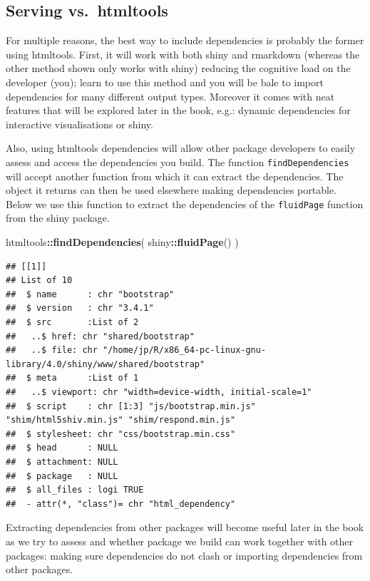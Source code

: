 \documentclass[
]{krantz}
\makeatletter
\newenvironment{Shaded}{\begin{snugshade}}{\end{snugshade}}
\newcommand{\KeywordTok}[1]{\textcolor[rgb]{0.27,0.27,0.27}{\textbf{#1}}}
\newcommand{\NormalTok}[1]{#1}
\newcommand{\OperatorTok}[1]{\textcolor[rgb]{0.43,0.43,0.43}{\textbf{#1}}}
\newenvironment{kframe}{%
\medskip{}
\setlength{\fboxsep}{.8em}
 \def\at@end@of@kframe{}%
 \ifinner\ifhmode%
  \def\at@end@of@kframe{\end{minipage}}%
  \begin{minipage}{\columnwidth}%
 \fi\fi%
 \def\FrameCommand##1{\hskip\@totalleftmargin \hskip-\fboxsep
 \colorbox{shadecolor}{##1}\hskip-\fboxsep
     \hskip-\linewidth \hskip-\@totalleftmargin \hskip\columnwidth}%
 \MakeFramed {\advance\hsize-\width
   \@totalleftmargin\z@ \linewidth\hsize
   \@setminipage}}%
 {\par\unskip\endMakeFramed%
 \at@end@of@kframe}
\renewenvironment{Shaded}{\begin{kframe}}{\end{kframe}}
\makeatother
\begin{document}
\hypertarget{basics-deps-pro-cons}{%
\subsection{Serving vs.~htmltools}\label{basics-deps-pro-cons}}

For multiple reasons, the best way to include dependencies is probably the former using htmltools. First, it will work with both shiny and rmarkdown \citep{R-rmarkdown} (whereas the other method shown only works with shiny) reducing the cognitive load on the developer (you); learn to use this method and you will be bale to import dependencies for many different output types. Moreover it comes with neat features that will be explored later in the book, e.g.: dynamic dependencies for interactive visualisations or shiny.

Also, using htmltools dependencies will allow other package developers to easily assess and access the dependencies you build. The function \texttt{findDependencies} will accept another function from which it can extract the dependencies. The object it returns can then be used elsewhere making dependencies portable. Below we use this function to extract the dependencies of the \texttt{fluidPage} function from the shiny package.

\begin{Shaded}
\begin{Highlighting}[]
\NormalTok{htmltools}\OperatorTok{::}\KeywordTok{findDependencies}\NormalTok{(}
\NormalTok{  shiny}\OperatorTok{::}\KeywordTok{fluidPage}\NormalTok{()}
\NormalTok{) }
\end{Highlighting}
\end{Shaded}

\begin{verbatim}
## [[1]]
## List of 10
##  $ name      : chr "bootstrap"
##  $ version   : chr "3.4.1"
##  $ src       :List of 2
##   ..$ href: chr "shared/bootstrap"
##   ..$ file: chr "/home/jp/R/x86_64-pc-linux-gnu-library/4.0/shiny/www/shared/bootstrap"
##  $ meta      :List of 1
##   ..$ viewport: chr "width=device-width, initial-scale=1"
##  $ script    : chr [1:3] "js/bootstrap.min.js" "shim/html5shiv.min.js" "shim/respond.min.js"
##  $ stylesheet: chr "css/bootstrap.min.css"
##  $ head      : NULL
##  $ attachment: NULL
##  $ package   : NULL
##  $ all_files : logi TRUE
##  - attr(*, "class")= chr "html_dependency"
\end{verbatim}

Extracting dependencies from other packages will become useful later in the book as we try to assess and whether package we build can work together with other packages: making sure dependencies do not clash or importing dependencies from other packages.
\end{document}
